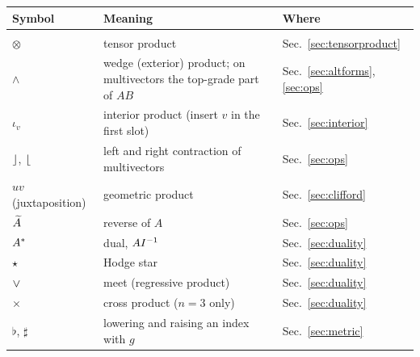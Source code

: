 \par\medskip\noindent\begin{tabular}{@{}>{\raggedright\arraybackslash}p{3.2cm}>{\raggedright\arraybackslash}p{8.8cm}>{\raggedright\arraybackslash}p{2.4cm}@{}}
\toprule
\textbf{Symbol} & \textbf{Meaning} & \textbf{Where}\\
\midrule
\multicolumn{3}{@{}l}{\emph{Algebraic operations}}\\
$\otimes$ & tensor product & Sec.~\ref{sec:tensorproduct}\\
$\wedge$ & wedge (exterior) product; on multivectors the top-grade part of $AB$ & Sec.~\ref{sec:altforms}, \ref{sec:ops}\\
$\iota_v$ & interior product (insert $v$ in the first slot) & Sec.~\ref{sec:interior}\\
$\mathbin{\rfloor}$, $\mathbin{\lfloor}$ & left and right contraction of multivectors & Sec.~\ref{sec:ops}\\
$uv$ (juxtaposition) & geometric product & Sec.~\ref{sec:clifford}\\
$\widetilde{A}$ & reverse of $A$ & Sec.~\ref{sec:ops}\\
$A^{\ast}$ & dual, $AI^{-1}$ & Sec.~\ref{sec:duality}\\
$\star$ & Hodge star & Sec.~\ref{sec:duality}\\
$\vee$ & meet (regressive product) & Sec.~\ref{sec:duality}\\
$\times$ & cross product ($n=3$ only) & Sec.~\ref{sec:duality}\\
$\flat$, $\sharp$ & lowering and raising an index with $g$ & Sec.~\ref{sec:metric}\\
\bottomrule
\end{tabular}
